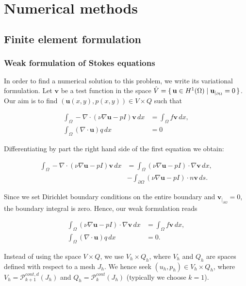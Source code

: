 \documentclass[11pt,a4paper,titlepage]{report}
\begin{document}
\chapter{Numerical methods}

\section{Finite element formulation}

\subsection{Weak formulation of Stokes equations}

In order to find a numerical solution to this problem, we write its variational formulation. Let $\mathbf{v}$ be a test function in the space $\hat{V} = \set{\mathbf{u} \in H^1(\Omega) | \mathbf{u}_{|_{\partial \Omega}} = 0} $. Our aim is to find $(\mathbf{u}(x,y),p(x,y)) \in V \times Q$ such that

\begin{align}
\int_\Omega -\nabla \cdot (\nu \nabla \mathbf{u} - pI)\mathbf{v} \,dx &= \int_\Omega f \mathbf{v} \,dx, \\
\int_\Omega (\nabla \cdot \mathbf{u})q \,dx &= 0
\end{align}

Differentiating by part the right hand side of the first equation we obtain:

\begin{align}
\int_\Omega -\nabla \cdot (\nu \nabla \mathbf{u} - pI)\mathbf{v} \,dx &= \int_\Omega (\nu \nabla \mathbf{u} - pI) \cdot \nabla \mathbf{v} \,dx, \\
&- \int_{\partial \Omega} (\nu \nabla \mathbf{u} - pI) \cdot n \mathbf{v} \,ds.
\end{align}

Since we set Dirichlet boundary conditions on the entire boundary and $\mathbf{v}_{|_{\partial \Omega}} = 0$, the boundary integral is zero. Hence, our weak formulation reads

\begin{align}
\int_\Omega (\nu \nabla \mathbf{u} - pI) \cdot \nabla \mathbf{v} \,dx &= \int_\Omega f\mathbf{v} \,dx, \\
\int_\Omega (\nabla \cdot \mathbf{u}) q \,dx &= 0.
\end{align}

Instead of using the space $V \times Q$, we use $V_h \times Q_h$, where $V_h$ and $Q_h$ are spaces defined with respect to a mesh $J_h$. We hence seek $(u_h, p_h) \in V_h \times Q_h$, where $V_h = \mathcal{P}^{cont,d}_{k+1} (J_h)$ and $Q_h = \mathcal{P}^{cont}_{k} (J_h)$ (typically we choose $k=1$). \\
\end{document}
